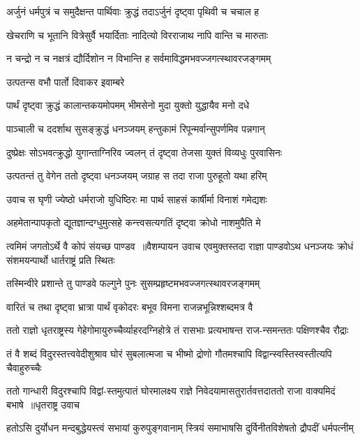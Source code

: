 \twolineshloka
{अर्जुनं धर्मपुत्रं च समुदैक्षन्त पार्थिवाः}
{क्रुद्धं तदाऽर्जुनं दृष्ट्वा पृथिवी च चचाल ह}


\threelineshloka
{खेचराणि च भूतानि वित्रेसुर्वै भयार्दिताः}
{नादित्यो विरराजाथ नापि वान्ति च मारुताः}
{}


\twolineshloka
{न चन्द्रो न च नक्षत्रं द्यौर्दिशोन न विभान्ति ह}
{सर्वमाविद्धमभवज्जगत्स्थावरजङ्गमम्}


\twolineshloka
{उत्पतन्स वभौ पार्तो दिवाकर इवाम्बरे}
{}


\twolineshloka
{पार्थं दृष्ट्वा क्रुद्धं कालान्तकयमोपमम्}
{भीमसेनो मुदा युक्तो युद्धायैव मनो दधे}


\twolineshloka
{पाञ्चाली च ददर्शाथ सुसङ्क्रुद्धं धनञ्जयम्}
{हन्तुकामं रिपून्मर्वान्सुपर्णमिव पन्नगान्}


\twolineshloka
{दुष्प्रेक्षः सोऽभवत्क्रुद्धो युगान्ताग्निरिव ज्वलन्}
{तं दृष्ट्वा तेजसा युक्तं विव्यधुः पुरवासिनः}


\twolineshloka
{उत्पतन्तं तु वेगेन ततो दृष्ट्वा धनञ्जयम्}
{जग्राह स तदा राजा पुरुहूतो यथा हरिम्}


\twolineshloka
{उवाच स घृणी ज्येष्ठो धर्मराजो युधिष्ठिरः}
{मा पार्थ साहसं कार्षीर्मा विनाशं गमेद्यशः}


\twolineshloka
{अहमेतान्पापकृतो द्यूतज्ञान्दग्धुमुत्सहे}
{कन्त्त्वसत्यगतिं दृष्ट्वा क्रोधो नाशमुपैति मे}


त्वमिमं जगतोऽर्थे वै कोपं संयच्छ पाण्डव ॥वैशम्पायन उवाच
\twolineshloka
{एवमुक्तस्तदा राज्ञा पाण्डवोऽथ धनञ्जयः}
{क्रोधं संशमयन्पार्थो धार्तराष्ट्रं प्रति स्थितः}


\twolineshloka
{तस्मिन्वीरे प्रशान्ते तु पाण्डवे फल्गुने पुनः}
{सुसम्प्रहृष्टमभवज्जगत्स्थावरजङ्गमम्}


\twolineshloka
{वारितं च तथा दृष्ट्वा भ्रात्रा पार्थं वृकोदरः}
{बभूव विमना राजन्नभून्निश्शब्दमत्र वै}


\twolineshloka
{ततो राज्ञो धृतराष्ट्रस्य गेहेगोमायुरुच्चैर्व्याहरदग्निहोत्रे}
{तं रासभाः प्रत्यभाषन्त राज-न्समन्ततः पक्षिणश्चैव रौद्राः}


\twolineshloka
{तं वै शब्दं विदुरस्तत्त्ववेदीशुश्राव घोरं सुबलात्मजा च}
{भीष्मो द्रोणो गौतमश्चापि विद्वान्स्वस्तिस्वस्तीत्यपि चैवाहुरुच्चैः}


\twolineshloka
{ततो गान्धारी विदुरश्चापि विद्वां-स्तमुत्पातं घोरमालक्ष्य राज्ञे}
{निवेदयामासतुरार्तवत्तदाततो राजा वाक्यमिदं बभाषे ॥धृतराष्ट्र उवाच}


\twolineshloka
{हतोऽसि दुर्योधन मन्दबुद्धेयस्त्वं सभायां कुरुपुङ्गवानाम्}
{स्त्रियं समाभाषसि दुर्विनीतविशेषतो द्रौपदीं धर्मपत्नीम्}


